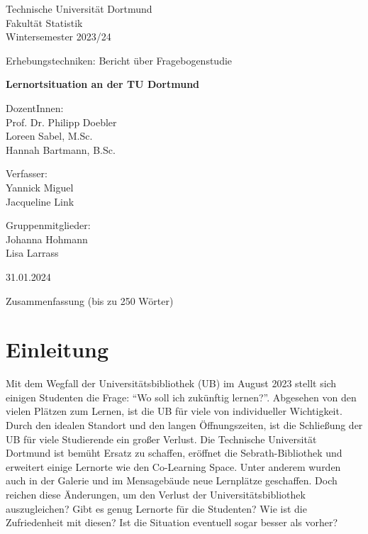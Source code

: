 \documentclass[11pt, a4paper]{article}
\begin{document}
\thispagestyle{empty}

\begin{center}
	\Large
	Technische Universität Dortmund\\
	Fakultät Statistik\\
	Wintersemester 2023/24\\
	
	\vspace{6em}
	
	Erhebungstechniken: Bericht über Fragebogenstudie
	
	\Huge
	\textbf{Lernortsituation an der TU Dortmund}
	
	\Large
	\vspace{4em}
	DozentInnen:	\\Prof. Dr. Philipp Doebler \\Loreen Sabel, M.Sc.\\Hannah Bartmann, B.Sc.


	\vspace{6em}
	Verfasser: \\
	Yannick Miguel \\Jacqueline Link
	
	\vspace{6em}
	Gruppenmitglieder:\\
	Johanna Hohmann\\
	Lisa Larrass
	
    \vspace{6em}
    
	31.01.2024
\end{center}

\newpage \null\thispagestyle{empty}\newpage
\tableofcontents
\newpage\null\thispagestyle{empty}\newpage
Zusammenfassung (bis zu 250 Wörter)
\newpage\null\thispagestyle{empty}\newpage

\newpage
\cleardoublepage%
\section{Einleitung}
\label{Einleitung}
Mit dem Wegfall der Universitätsbibliothek (UB) im August 2023 stellt sich einigen Studenten die Frage: “Wo soll ich zukünftig lernen?”.
Abgesehen von den vielen Plätzen zum Lernen, ist die UB für viele von individueller Wichtigkeit.
Durch den idealen Standort und den langen Öffnungszeiten, ist die Schließung der UB für viele Studierende ein großer Verlust.
Die Technische Universität Dortmund ist bemüht Ersatz zu schaffen, eröffnet die Sebrath-Bibliothek und erweitert einige Lernorte wie den Co-Learning Space.
Unter anderem wurden auch in der Galerie und im Mensagebäude neue Lernplätze geschaffen.
Doch reichen diese Änderungen, um den Verlust der Universitätsbibliothek auszugleichen?
Gibt es genug Lernorte für die Studenten? Wie ist die Zufriedenheit mit diesen?
Ist die Situation eventuell sogar besser als vorher?
\end{document}
